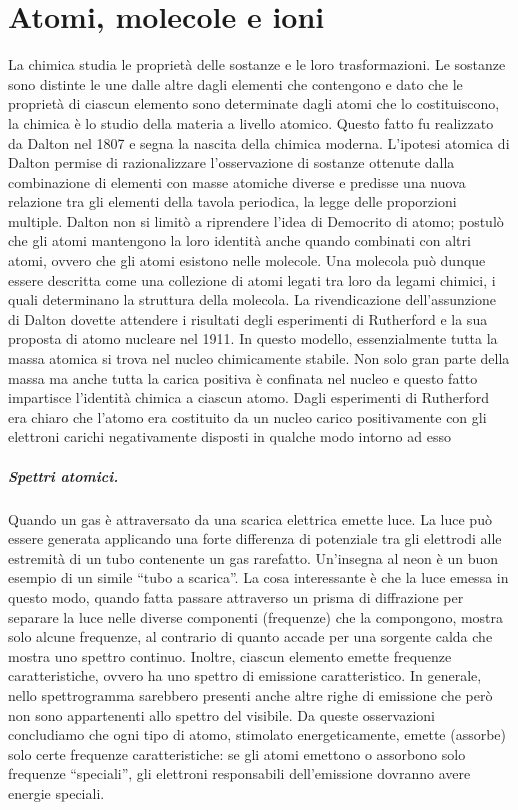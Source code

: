 \chapter{Atomi, molecole e ioni}
La chimica studia le proprietà delle sostanze e le loro trasformazioni. Le sostanze sono distinte le une dalle altre dagli elementi che contengono e dato che le proprietà di ciascun elemento sono determinate dagli atomi che lo costituiscono, la chimica è lo studio della materia a livello atomico. Questo fatto fu realizzato da Dalton nel 1807 e segna la nascita della chimica moderna. L'ipotesi atomica di Dalton permise di razionalizzare l'osservazione di sostanze ottenute dalla combinazione di elementi con masse atomiche diverse e predisse una nuova relazione tra gli elementi della tavola periodica, la legge delle proporzioni multiple. Dalton non si limitò a riprendere l'idea di Democrito di atomo; postulò che gli atomi mantengono la loro identità anche quando combinati con altri atomi, ovvero che gli atomi esistono nelle molecole. Una molecola può dunque essere descritta come una collezione di atomi legati tra loro da legami chimici, i quali determinano la struttura della molecola. 
La rivendicazione dell'assunzione di Dalton dovette attendere i risultati degli esperimenti di Rutherford e la sua proposta di atomo nucleare nel 1911. In questo modello, essenzialmente tutta la massa atomica si trova nel nucleo chimicamente stabile. Non solo gran parte della massa ma anche tutta la carica positiva è confinata nel nucleo e questo fatto impartisce l'identità chimica a ciascun atomo. Dagli esperimenti di Rutherford era chiaro che l'atomo era costituito da un nucleo carico positivamente con gli elettroni carichi negativamente disposti in qualche modo intorno ad esso
\paragraph{Spettri atomici.} Quando un gas è attraversato da una scarica elettrica emette luce. La luce può essere generata applicando una forte differenza di potenziale tra gli elettrodi alle estremità di un tubo contenente un gas rarefatto. Un'insegna al neon è un buon esempio di un simile “tubo a scarica”. La cosa interessante è che la luce emessa in questo modo, quando fatta passare attraverso un prisma di diffrazione per separare la luce nelle diverse componenti (frequenze) che la compongono, mostra solo alcune frequenze, al contrario di quanto accade per una sorgente calda che mostra uno spettro continuo. Inoltre, ciascun elemento emette frequenze caratteristiche, ovvero ha uno spettro di emissione caratteristico. In generale, nello spettrogramma sarebbero presenti anche altre righe di emissione che però non sono appartenenti allo spettro del visibile. Da queste osservazioni concludiamo che ogni tipo di atomo, stimolato energeticamente, emette (assorbe) solo certe frequenze caratteristiche: se gli atomi emettono o assorbono solo frequenze “speciali”, gli elettroni responsabili dell'emissione dovranno avere energie speciali.
